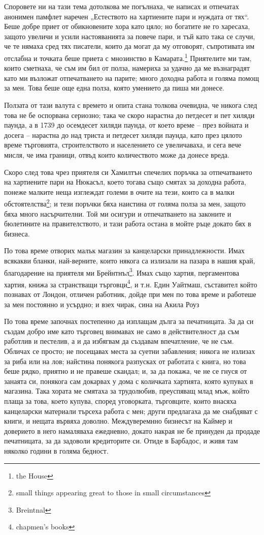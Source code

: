 \documentclass[12pt]{book}
\begin{document}
Споровете ни на тази тема дотолкова ме погълнаха, че написах и отпечатах анонимен памфлет наречен „Естеството на хартиените пари и нуждата от тях“. Беше добре приет от обикновените хора като цяло; но богатите не го харесаха, защото увеличи и усили настояванията за повече пари, и тъй като така се случи, че те нямаха сред тях писатели, които да могат да му отговорят, съпротивата им отслабна и точката беше приета с мнозинство в Камарата.\footnote{the House} Приятелите ми там, които сметнаха, че съм им бил от полза, намериха за удачно да ме възнаградят като ми възложат отпечатването на парите; много доходна работа и голяма помощ за мен. Това беше още една полза, която умението да пиша ми донесе. 

Ползата от тази валута с времето и опита стана толкова очевидна, че никога след това не бе оспорвана сериозно; така че скоро нарастна до петдесет и пет хиляди паунда, а в 1739 до осемдесет хиляди паунда, от което време – през войната и досега – нарастна до над триста и петдесет хиляди паунда, като през цялото време търговията, строителството и населението се увеличаваха, и сега вече мисля, че има граници, отвъд които количеството може да донесе вреда.

Скоро след това чрез приятеля си Хамилтън спечелих поръчка за отпечатването на хартиените пари на Нюкасъл, което тогава също смятах за доходна работа, понеже малките неща изглеждат големи в очите на тези, които са в малки обстоятелства\footnote{small things appearing great to those in small circumstances}; и тези поръчки бяха наистина от голяма полза за мен, защото бяха много насърчителни. Той ми осигури и отпечатването на законите и бюлетините на правителството, и тази работа остана в мойте ръце докато бях в бизнеса. 

По това време отворих малък магазин за канцеларски принадлежности. Имах всякакви бланки, най-верните, които някога са излизали на пазара в нашия край, благодарение на приятеля ми Брейнтнъл\footnote{Breintnal}. Имах също хартия, пергаментова хартия, книжа за странстващи търговци\footnote{chapmen's books}, и т.н. Един Уайтмаш, съставител който познавах от Лондон, отличен работник, дойде при мен по това време и работеше за мен постоянно и усърдно; и взех чирак, сина на Акила Роуз

По това време започнах постепенно да изплащам дълга за печатницата. За да си създам добро име като търговец внимавах не само в действителност да съм работлив и пестелив, а и да избягвам да създавам впечатление, че не съм. Обличах се просто; не посещавах места за суетни забавления; никога не излизах за риба или на лов; найстина понякога разпусках от работата с книга, но това беше рядко, приятно и не правеше скандал; и, за да покажа, че не се гнуся от занаята си, понякога сам докарвах у дома с количката хартията, която купувах в магазина. Така хората ме смятаха за трудолюбив, преуспяващ млад мъж, който плаща за това, което купува, според уговорката, търговците, които внасяха канцеларски материали търсеха работа с мен; други предлагаха да ме снабдяват с книги, и нещата вървяха доволно. Междуверемнно бизнесът на Каймер и доверието в него намаляваха ежедневно, докато накрая не бе принуден да продаде печатницата, за да задоволи кредиторите си. Отиде в Барбадос, и живя там няколко години в голяма бедност. 
\end{document}
